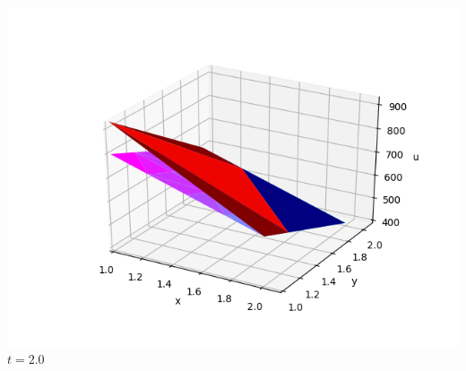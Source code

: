 \documentclass[]{beamer}
\begin{document}
\begin{frame}[t]
\begin{columns}
\begin{center}
			\includegraphics[scale=0.2]{figures/2D_rz_ls1m/2D_rz_ls1mat_u_vs_x_20}\\
			$t=2.0$
			\end{center}
	\end{columns}
\end{frame}
\end{document}
